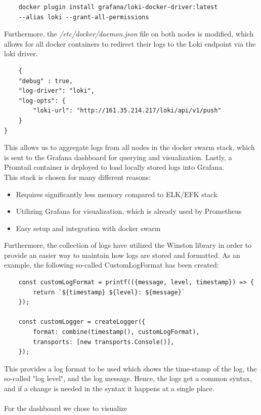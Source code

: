 \begin{verbatim}
    docker plugin install grafana/loki-docker-driver:latest
    --alias loki --grant-all-permissions
\end{verbatim}

Furthermore, the \textit{/etc/docker/daemon.json} file on both nodes is modified, which allows for all docker containers to redirect their logs to the Loki endpoint via the loki driver.

\begin{verbatim}
    {
    "debug" : true,
    "log-driver": "loki",
    "log-opts": {
        "loki-url": "http://161.35.214.217/loki/api/v1/push"
    }
}
\end{verbatim}

This allows us to aggregate logs from all nodes in the docker swarm stack, which is sent to the Grafana dashboard for querying and visualization. Lastly, a Promtail container is deployed to load locally stored logs into Grafana.\\

\noindent
This stack is chosen for many different reasons:
\begin{itemize}
    \item Requires significantly less memory compared to ELK/EFK stack
    \item Utilizing Grafana for visualization, which is already used by Prometheus
    \item Easy setup and integration with docker swarm
\end{itemize}

Furthermore, the collection of logs have utilized the Winston library in order to provide an easier way to maintain how logs are stored and formatted.\cite{winston} As an example, the following so-called CustomLogFormat has been created:
\begin{verbatim}
    const customLogFormat = printf(({message, level, timestamp}) => {
        return `${timestamp} ${level}: ${message}`
    });
    
    const customLogger = createLogger({
        format: combine(timestamp(), customLogFormat),
        transports: [new transports.Console()],
    });
\end{verbatim}
This provides a log format to be used which shows the time-stamp of the log, the so-called "log level", and the log message. Hence, the logs get a common syntax, and if a change is needed in the syntax it happens at a single place.
\\\\
\noindent
For the dashboard we chose to visualize 


